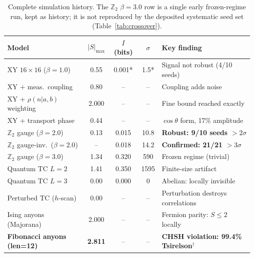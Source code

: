 \documentclass[aps,pra,twocolumn,superscriptaddress,showpacs,floatfix]{revtex4-2}
\newcommand{\Ztwo}{\mathbb{Z}_2}
\begin{document}
\begin{table}[h]
\caption{Complete simulation history. The $\Ztwo$ $\beta{=}3.0$ row is a single early frozen-regime run, kept as history; it is not reproduced by the deposited systematic seed set (Table~\ref{tab:crossover}).}
\label{tab:history}
\begin{ruledtabular}
\begin{tabular}{lcccp{5.5cm}}
Model & $|S|_\mathrm{max}$ & $I$ (bits) & $\sigma$ & Key finding \\
\midrule
XY $16{\times}16$ ($\beta{=}1.0$) & 0.55 & 0.001* & 1.5* & Signal not robust (4/10 seeds) \\
XY + meas.\ coupling         & 0.80 & --    & --   & Coupling adds noise \\
XY + $\rho(n|a,b)$ weighting & 2.000 & --   & --   & Fine bound reached exactly \\
XY + transport phase          & 0.44 & --    & --   & $\cos\theta$ form, 17\% amplitude \\
$\Ztwo$ gauge ($\beta{=}2.0$)  & 0.13 & 0.015 & 10.8 & \textbf{Robust: 9/10 seeds ${>}2\sigma$} \\
$\Ztwo$ gauge-inv.\ ($\beta{=}2.0$) & -- & 0.018 & 14.2 & \textbf{Confirmed: 21/21 ${>}3\sigma$} \\
$\Ztwo$ gauge ($\beta{=}3.0$)  & 1.34 & 0.320 & 590  & Frozen regime (trivial) \\
Quantum TC $L{=}2$            & 1.41 & 0.350 & 1595 & Finite-size artifact \\
Quantum TC $L{=}3$            & 0.00 & 0.000 & 0    & Abelian: locally invisible \\
Perturbed TC ($h$-scan)        & 0.00 & --    & --   & Perturbation destroys correlations \\
Ising anyons (Majorana)        & 2.000 & --   & --   & Fermion parity: $S{\leq}2$ locally \\
\textbf{Fibonacci anyons (len=12)} & \textbf{2.811} & -- & -- & \textbf{CHSH violation: 99.4\% Tsirelson$^\dagger$} \\
\end{tabular}
\end{ruledtabular}
\end{table}
\end{document}
